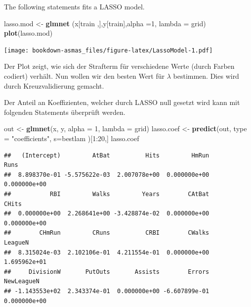\documentclass[]{book}
\newenvironment{Shaded}{\begin{snugshade}}{\end{snugshade}}
\newcommand{\KeywordTok}[1]{\textcolor[rgb]{0.13,0.29,0.53}{\textbf{{#1}}}}
\newcommand{\DataTypeTok}[1]{\textcolor[rgb]{0.13,0.29,0.53}{{#1}}}
\newcommand{\DecValTok}[1]{\textcolor[rgb]{0.00,0.00,0.81}{{#1}}}
\newcommand{\StringTok}[1]{\textcolor[rgb]{0.31,0.60,0.02}{{#1}}}
\newcommand{\NormalTok}[1]{{#1}}
\begin{document}
The following statements fits a LASSO model.

\begin{Shaded}
\begin{Highlighting}[]
\NormalTok{lasso.mod <-}\StringTok{ }\KeywordTok{glmnet} \NormalTok{(x[train ,],y[train],}\DataTypeTok{alpha =}\DecValTok{1}\NormalTok{, }\DataTypeTok{lambda =} \NormalTok{grid)}
\KeywordTok{plot}\NormalTok{(lasso.mod)}
\end{Highlighting}
\end{Shaded}

\texttt{[image: bookdown-asmas\_files/figure-latex/LassoModel-1.pdf]}

Der Plot zeigt, wie sich der Strafterm für verschiedene Werte (durch
Farben codiert) verhält. Nun wollen wir den besten Wert für \(\lambda\)
bestimmen. Dies wird durch Kreuzvalidierung gemacht.

\begin{Shaded}
\end{Shaded}

Der Anteil an Koeffizienten, welcher durch LASSO null gesetzt wird kann
mit folgenden Statements überprüft werden.

\begin{Shaded}
\begin{Highlighting}[]
\NormalTok{out <-}\StringTok{ }\KeywordTok{glmnet}\NormalTok{(x, y, }\DataTypeTok{alpha =} \DecValTok{1}\NormalTok{, }\DataTypeTok{lambda =} \NormalTok{grid)}
\NormalTok{lasso.coef <-}\StringTok{ }\KeywordTok{predict}\NormalTok{(out, }\DataTypeTok{type =} \StringTok{"coefficients"}\NormalTok{, }\DataTypeTok{s=}\NormalTok{bestlam )[}\DecValTok{1}\NormalTok{:}\DecValTok{20}\NormalTok{,]}
\NormalTok{lasso.coef}
\end{Highlighting}
\end{Shaded}

\begin{verbatim}
##   (Intercept)         AtBat          Hits         HmRun          Runs 
##  8.898370e-01 -5.575622e-03  2.007078e+00  0.000000e+00  0.000000e+00 
##           RBI         Walks         Years        CAtBat         CHits 
##  0.000000e+00  2.268641e+00 -3.428874e-02  0.000000e+00  0.000000e+00 
##        CHmRun         CRuns          CRBI        CWalks       LeagueN 
##  8.315024e-03  2.102106e-01  4.211554e-01  0.000000e+00  1.695962e+01 
##     DivisionW       PutOuts       Assists        Errors    NewLeagueN 
## -1.143553e+02  2.343374e-01  0.000000e+00 -6.607899e-01  0.000000e+00
\end{verbatim}
\end{document}
